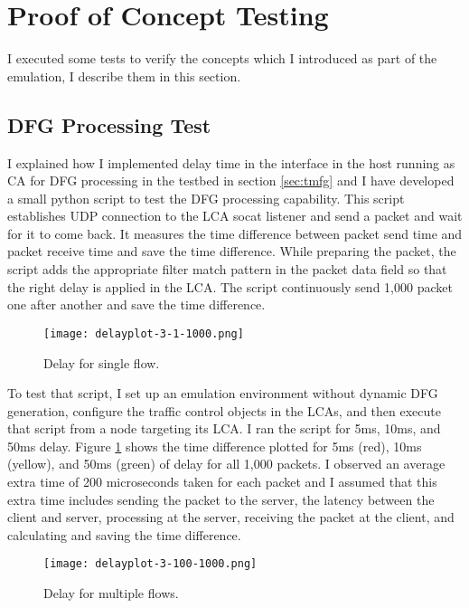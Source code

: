 \section{Proof of Concept Testing}\label{sec:poct}
I executed some tests to verify the concepts which I introduced as part of the emulation, I describe them in this section.
\subsection{DFG Processing Test}
I explained how I implemented delay time in the interface in the host running as CA for DFG processing in the testbed in section \ref{sec:tmfg} and I have developed a small python script to test the DFG processing capability. This script establishes UDP connection to the LCA socat listener and send a packet and wait for it to come back. It measures the time difference between packet send time and packet receive time and save the time difference. While preparing the packet, the script adds the appropriate filter match pattern in the packet data field so that the right delay is applied in the LCA. The script continuously send 1,000 packet one after another and save the time difference.
\begin{figure}[tb]
	\begin{center}
		\resizebox{\textwidth}{!}
		{\texttt{[image: delayplot-3-1-1000.png]}}
		\caption{Delay for single flow.}
		\label{fig:delayplotsingle}
	\end{center}
\end{figure}

To test that script, I set up an emulation environment without dynamic DFG generation, configure the traffic control objects in the LCAs, and then execute that script from a node targeting its LCA. I ran the script for 5ms, 10ms, and 50ms delay. Figure \ref{fig:delayplotsingle} shows the time difference plotted for 5ms (red), 10ms (yellow), and 50ms (green) of delay for all 1,000 packets. I observed an average extra time of 200 microseconds taken for each packet and I assumed that this extra time includes sending the packet to the server, the latency between the client and server, processing at the server, receiving the packet at the client, and calculating and saving the time difference.
\begin{figure}[tb]
	\begin{center}
		\resizebox{\textwidth}{!}
		{\texttt{[image: delayplot-3-100-1000.png]}}
		\caption{Delay for multiple flows.}
		\label{fig:delayplotmulti}
	\end{center}
\end{figure}

